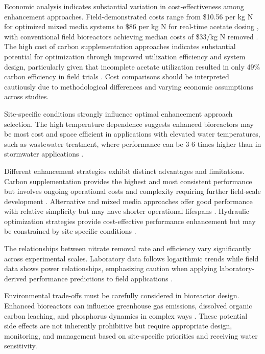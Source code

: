 \documentclass[12pt,a4paper]{article}
\begin{document}
Economic analysis indicates substantial variation in cost-effectiveness among enhancement approaches. Field-demonstrated costs range from \$10.56 per kg N for optimized mixed media systems \citep{new_ref_4} to \$86 per kg N for real-time acetate dosing \citep{RN242}, with conventional field bioreactors achieving median costs of \$33/kg N removed \citep{RN312}. The high cost of carbon supplementation approaches indicates substantial potential for optimization through improved utilization efficiency and system design, particularly given that incomplete acetate utilization resulted in only 49\% carbon efficiency in field trials \citep{RN242}. Cost comparisons should be interpreted cautiously due to methodological differences and varying economic assumptions across studies.

Site-specific conditions strongly influence optimal enhancement approach selection. The high temperature dependence suggests enhanced bioreactors may be most cost and space efficient in applications with elevated water temperatures, such as wastewater treatment, where performance can be 3-6 times higher than in stormwater applications \citep{RN258, RN315}.

Different enhancement strategies exhibit distinct advantages and limitations. Carbon supplementation provides the highest and most consistent performance but involves ongoing operational costs and complexity requiring further field-scale development \citep{RN242, RN242}. Alternative and mixed media approaches offer good performance with relative simplicity but may have shorter operational lifespans \citep{new_ref_2, new_ref_4}. Hydraulic optimization strategies provide cost-effective performance enhancement but may be constrained by site-specific conditions \citep{RN309}.

The relationships between nitrate removal rate and efficiency vary significantly across experimental scales. Laboratory data follows logarithmic trends while field data shows power relationships, emphasizing caution when applying laboratory-derived performance predictions to field applications \citep{RN312}.

Environmental trade-offs must be carefully considered in bioreactor design. Enhanced bioreactors can influence greenhouse gas emissions, dissolved organic carbon leaching, and phosphorus dynamics in complex ways \citep{RN1181, RN625, RN625}. These potential side effects are not inherently prohibitive but require appropriate design, monitoring, and management based on site-specific priorities and receiving water sensitivity.
\end{document}
